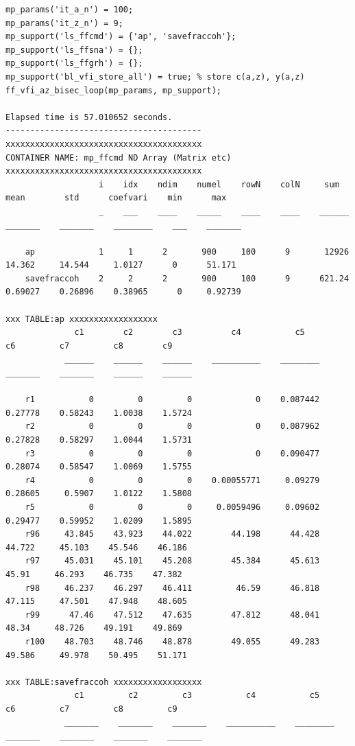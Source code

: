 \documentclass[
]{book}
\begin{document}
\begin{verbatim}
mp_params('it_a_n') = 100;
mp_params('it_z_n') = 9;
mp_support('ls_ffcmd') = {'ap', 'savefraccoh'};
mp_support('ls_ffsna') = {};
mp_support('ls_ffgrh') = {};
mp_support('bl_vfi_store_all') = true; % store c(a,z), y(a,z)
ff_vfi_az_bisec_loop(mp_params, mp_support);

Elapsed time is 57.010652 seconds.
----------------------------------------
xxxxxxxxxxxxxxxxxxxxxxxxxxxxxxxxxxxxxxxx
CONTAINER NAME: mp_ffcmd ND Array (Matrix etc)
xxxxxxxxxxxxxxxxxxxxxxxxxxxxxxxxxxxxxxxx
                   i    idx    ndim    numel    rowN    colN     sum       mean        std      coefvari    min      max  
                   _    ___    ____    _____    ____    ____    ______    _______    _______    ________    ___    _______

    ap             1     1      2       900     100      9       12926     14.362     14.544     1.0127      0      51.171
    savefraccoh    2     2      2       900     100      9      621.24    0.69027    0.26896    0.38965      0     0.92739

xxx TABLE:ap xxxxxxxxxxxxxxxxxx
              c1        c2        c3          c4           c5         c6         c7         c8        c9  
            ______    ______    ______    __________    ________    _______    _______    ______    ______

    r1           0         0         0             0    0.087442    0.27778    0.58243    1.0038    1.5724
    r2           0         0         0             0    0.087962    0.27828    0.58297    1.0044    1.5731
    r3           0         0         0             0    0.090477    0.28074    0.58547    1.0069    1.5755
    r4           0         0         0    0.00055771     0.09279    0.28605     0.5907    1.0122    1.5808
    r5           0         0         0     0.0059496     0.09602    0.29477    0.59952    1.0209    1.5895
    r96     43.845    43.923    44.022        44.198      44.428     44.722     45.103    45.546    46.186
    r97     45.031    45.101    45.208        45.384      45.613      45.91     46.293    46.735    47.382
    r98     46.237    46.297    46.411         46.59      46.818     47.115     47.501    47.948    48.605
    r99      47.46    47.512    47.635        47.812      48.041      48.34     48.726    49.191    49.869
    r100    48.703    48.746    48.878        49.055      49.283     49.586     49.978    50.495    51.171

xxx TABLE:savefraccoh xxxxxxxxxxxxxxxxxx
              c1         c2         c3           c4           c5         c6         c7         c8         c9   
            _______    _______    _______    __________    ________    _______    _______    _______    _______


\end{verbatim}
\end{document}
